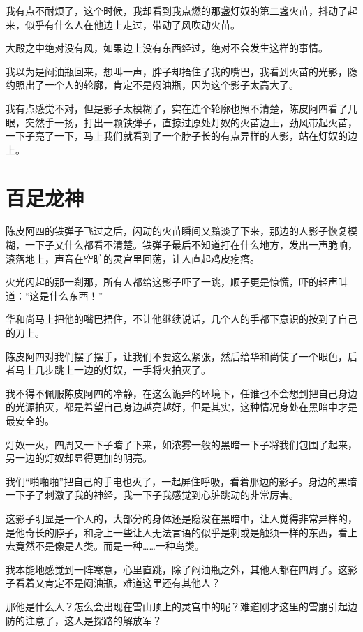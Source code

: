 我有点不耐烦了，这个时候，我却看到我点燃的那盏灯奴的第二盏火苗，抖动了起来，似乎有什么人在他边上走过，带动了风吹动火苗。

大殿之中绝对没有风，如果边上没有东西经过，绝对不会发生这样的事情。

我以为是闷油瓶回来，想叫一声，胖子却捂住了我的嘴巴，我看到火苗的光影，隐约照出了一个人的轮廓，肯定不是闷油瓶，因为这个影子太高大了。

我有点感觉不对，但是影子太模糊了，实在连个轮廓也照不清楚，陈皮阿四看了几眼，突然手一扬，打出一颗铁弹子，直掠过原处灯奴的火苗边上，劲风带起火苗，一下子亮了一下，马上我们就看到了一个脖子长的有点异样的人影，站在灯奴的边上。

\chapter{百足龙神}

陈皮阿四的铁弹子飞过之后，闪动的火苗瞬间又黯淡了下来，那边的人影子恢复模糊，一下子又什么都看不清楚。铁弹子最后不知道打在什么地方，发出一声脆响，滚落地上，声音在空旷的灵宫里回荡，让人直起鸡皮疙瘩。

火光闪起的那一刹那，所有人都给这影子吓了一跳，顺子更是惊慌，吓的轻声叫道：“这是什么东西！”

华和尚马上把他的嘴巴捂住，不让他继续说话，几个人的手都下意识的按到了自己的刀上。

陈皮阿四对我们摆了摆手，让我们不要这么紧张，然后给华和尚使了一个眼色，后者马上几步跳上一边的灯奴，一手将火拍灭了。

我不得不佩服陈皮阿四的冷静，在这么诡异的环境下，任谁也不会想到把自己身边的光源拍灭，都是希望自己身边越亮越好，但是其实，这种情况身处在黑暗中才是最安全的。

灯奴一灭，四周又一下子暗了下来，如浓雾一般的黑暗一下子将我们包围了起来，另一边的灯奴却显得更加的明亮。

我们“啪啪啪”把自己的手电也灭了，一起屏住呼吸，看着那边的影子。身边的黑暗一下子了刺激了我的神经，我一下子我感觉到心脏跳动的非常厉害。

这影子明显是一个人的，大部分的身体还是隐没在黑暗中，让人觉得非常异样的，是他奇长的脖子，和身上一些让人无法言语的似乎是刺或是触须一样的东西，看上去竟然不是像是人类。而是一种……一种鸟类。

我本能地感觉到一阵寒意，心里直跳，除了闷油瓶之外，其他人都在四周了。这影子看着又肯定不是闷油瓶，难道这里还有其他人？

那他是什么人？怎么会出现在雪山顶上的灵宫中的呢？难道刚才这里的雪崩引起边防的注意了，这人是探路的解放军？

